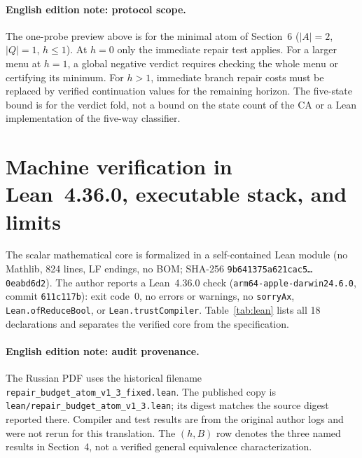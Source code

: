 \documentclass[11pt,a4paper]{article}
\theoremstyle{preprintthm}
\theoremstyle{preprintdef}
\begin{document}
\paragraph{English edition note: protocol scope.} The one-probe preview above is for the minimal atom of Section~6 ($|A|=2$, $|Q|=1$, $h\le1$). At $h=0$ only the immediate repair test applies. For a larger menu at $h=1$, a global negative verdict requires checking the whole menu or certifying its minimum. For $h>1$, immediate branch repair costs must be replaced by verified continuation values for the remaining horizon. The five-state bound is for the verdict fold, not a bound on the state count of the CA or a Lean implementation of the five-way classifier.

\section{Machine verification in Lean~4.36.0, executable stack, and limits}

The scalar mathematical core is formalized in a self-contained Lean module (no Mathlib, 824 lines, LF endings, no BOM; SHA-256 \texttt{9b641375a621cac5\ldots0eabd6d2}). The author reports a Lean~4.36.0 check (\texttt{arm64-apple-darwin24.6.0}, commit \texttt{611c117b}): exit code~0, no errors or warnings, no \texttt{sorryAx}, \texttt{Lean.ofReduceBool}, or \texttt{Lean.trustCompiler}. Table~\ref{tab:lean} lists all 18 declarations and separates the verified core from the specification.
\paragraph{English edition note: audit provenance.} The Russian PDF uses the historical filename \texttt{repair\_\allowbreak budget\_\allowbreak atom\_\allowbreak v1\_3\_fixed.lean}. The published copy is \texttt{lean/repair\_\allowbreak budget\_\allowbreak atom\_\allowbreak v1\_3.lean}; its digest matches the source digest reported there. Compiler and test results are from the original author logs and were not rerun for this translation. The $(h,B)$ row denotes the three named results in Section~4, not a verified general equivalence characterization.
\end{document}
